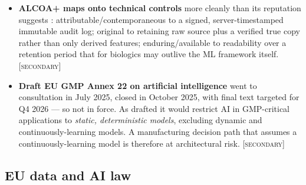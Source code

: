 \documentclass[11pt,a4paper]{article}
\newcommand{\flag}[1]{\textcolor{flagcolor}{\textbf{#1}}}
\newcommand{\secondary}{\textsc{[secondary]}}
\begin{document}
\begin{itemize}
  \item \textbf{ALCOA+ maps onto technical controls} more cleanly than its
  reputation suggests \citep{mhra2018dataintegrity, pics041}:
  attributable/contemporaneous to a signed, server-timestamped immutable
  audit log; original to retaining raw source plus a verified true copy
  rather than only derived features; enduring/available to readability over
  a retention period that for biologics may outlive the ML framework
  itself. \secondary

  \item \flag{Draft EU GMP Annex 22 on artificial intelligence}
  \citep{gmpannex22draft} went to consultation in July 2025, closed in
  October 2025, with final text targeted for Q4 2026 --- so not in force. As
  drafted it would restrict AI in GMP-critical applications to
  \emph{static, deterministic models}, excluding dynamic and
  continuously-learning models. A manufacturing decision path that assumes a
  continuously-learning model is therefore at architectural risk.
  \secondary
\end{itemize}

\subsection{EU data and AI law}
\end{document}
